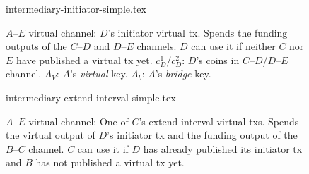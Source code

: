 %
  \begin{figure}[!htbp]
%
    {intermediary-initiator-simple.tex}
    \caption{$A$--$E$ virtual channel: $D$'s initiator virtual tx. Spends the
    funding outputs of the $C$--$D$ and $D$--$E$ channels. $D$ can use it if neither
    $C$ nor $E$ have published a virtual tx yet. $c_D^1/c_D^2$: $D$'s coins
    in $C$--$D$/$D$--$E$ channel. $A_V$: $A$'s
    \emph{virtual} key. $A_b$: $A$'s \emph{bridge} key.}
    \label{figure:virtual-layer-initiator-simple}
  \end{figure}
%
%
  \begin{figure}[!htbp]
%
    {intermediary-extend-interval-simple.tex}
    \caption{$A$--$E$ virtual channel: One of $C$'s extend-interval
    virtual txs. Spends the virtual output of $D$'s
    initiator tx and the funding output of the $B$--$C$ channel. $C$ can
    use it if $D$ has already published its initiator tx and $B$ has
    not published a virtual tx yet.}
    \label{figure:virtual-layer-extend-interval-simple}
  \end{figure}
%

